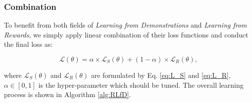 \subsubsection{Combination}
\label{sec:loss_combination}
To benefit from both fields of \emph{Learning from Demonstrations} and \emph{Learning from Rewards},
we simply apply linear combination of their loss functions
and conduct the final loss as:
\begin{small}
\begin{equation}
\label{eq:total_loss}
\mathcal{L}(\theta) = \alpha\times \mathcal{L}_{S}(\theta) + (1-\alpha)\times \mathcal{L}_{R}(\theta),
\end{equation}
\end{small}
where $\mathcal{L}_{S}(\theta)$ and $\mathcal{L}_{R}(\theta)$ are formulated by Eq. \ref{eq:L_S} and \ref{eq:L_R},
$\alpha\in[0,1]$ is the hyper-parameter which should be tuned.
The overall learning process is shown in Algorithm \ref{alg:RLfD}.
